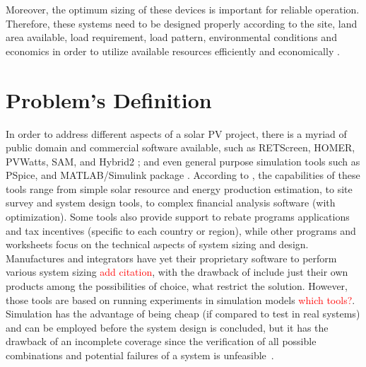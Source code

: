 Moreover, the optimum sizing of these devices is important for reliable operation. Therefore, these systems need to be designed properly according to the site, land area available, load requirement, load pattern, environmental conditions and economics in order to utilize available resources efficiently and economically \cite{Rawat}.

\section{Problem's Definition}

In order to address different aspects of a solar PV project, there is a myriad of public domain and commercial software available, such as RETScreen, HOMER, PVWatts, SAM, and Hybrid2 \cite{Pradhan,Swarnkar,NRELDobos,NRELBlair,Mills}; and even general purpose simulation tools such as PSpice, and MATLAB/Simulink package \cite{Gow1999,Benatiallah2017}. According to \cite{Brooks}, the capabilities of these tools range from simple solar resource and energy production estimation, to site survey and system design tools, to complex financial analysis software (with optimization). Some tools also provide support to rebate programs applications and tax incentives (specific to each country or region), while other programs and worksheets focus on the technical aspects of system sizing and design.  
%
Manufactures and integrators have yet their proprietary software to perform various system sizing \textcolor{red}{add citation}, with the drawback of include just their own products among the possibilities of choice, what restrict the solution. 
%
However, those tools are based on running experiments in simulation models \textcolor{red}{which tools?}. Simulation has the advantage of being cheap (if compared to test in real systems) and can be employed before the system design is concluded, but it has the drawback of an incomplete coverage since the verification of all possible combinations and potential failures of a system is unfeasible~\cite{ClarkeHV18}.

